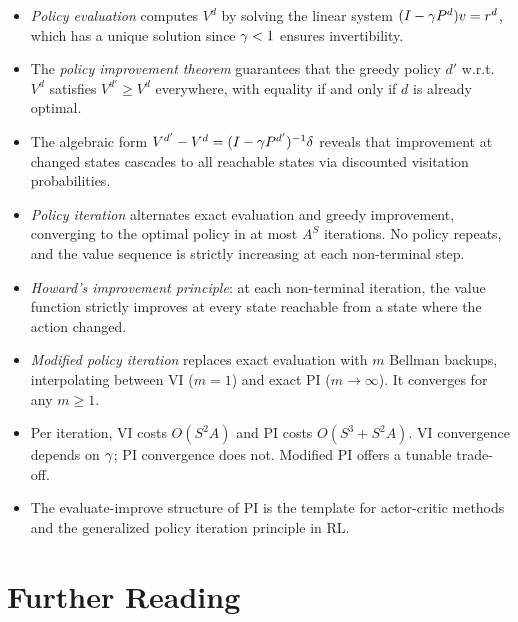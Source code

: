 \documentclass[11pt,a4paper]{article}
\begin{document}
\begin{itemize}
    \item \emph{Policy evaluation} computes $V^d$ by solving the
    linear system $(I - \gamma P^d) v = r^d$, which has a unique
    solution since $\gamma < 1$ ensures invertibility.
    \item The \emph{policy improvement theorem} guarantees that the
    greedy policy $d'$ w.r.t.\ $V^d$ satisfies $V^{d'} \geq V^d$
    everywhere, with equality if and only if $d$ is already optimal.
    \item The algebraic form
    $V^{d'} - V^d = (I - \gamma P^{d'})^{-1} \delta$ reveals
    that improvement at changed states cascades to all reachable
    states via discounted visitation probabilities.
    \item \emph{Policy iteration} alternates exact evaluation and
    greedy improvement, converging to the optimal policy in at most
    $A^S$ iterations. No policy repeats, and the value sequence is
    strictly increasing at each non-terminal step.
    \item \emph{Howard's improvement principle}: at each non-terminal
    iteration, the value function strictly improves at every state
    reachable from a state where the action changed.
    \item \emph{Modified policy iteration} replaces exact evaluation
    with $m$ Bellman backups, interpolating between VI ($m = 1$)
    and exact PI ($m \to \infty$). It converges for any $m \geq 1$.
    \item Per iteration, VI costs $O(S^2 A)$ and PI costs
    $O(S^3 + S^2 A)$. VI convergence depends on $\gamma$; PI
    convergence does not. Modified PI offers a tunable trade-off.
    \item The evaluate-improve structure of PI is the template for
    actor-critic methods and the generalized policy iteration
    principle in RL.
\end{itemize}


\section{Further Reading}
\label{sec:further-reading}
\end{document}

